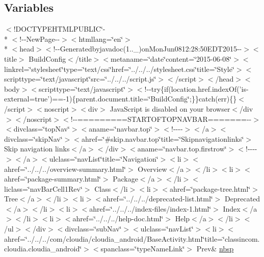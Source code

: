 \subsection*{Variables}
\begin{DoxyCompactItemize}
\item 
$<$!D\-O\-C\-T\-Y\-P\-E\-H\-T\-M\-L\-P\-U\-B\-L\-I\-C\char`\"{}-\/\\*
$<$!-\/-\/New\-Page-\/-\/$>$$<$htmllang=\char`\"{}en\char`\"{}$>$\\*
$<$head$>$$<$!-\/-\/Generatedbyjavadoc(1..\-\_)on\-Mon\-Jun0812\-:28\-:50\-E\-D\-T2015-\/-\/$>$$<$title$>$ Build\-Config$<$/title$>$$<$metaname=\char`\"{}date\char`\"{}content=\char`\"{}2015-\/06-\/08\char`\"{}$>$$<$linkrel=\char`\"{}stylesheet\char`\"{}type=\char`\"{}text/css\char`\"{}href=\char`\"{}../../../stylesheet.\-css\char`\"{}title=\char`\"{}\-Style\char`\"{}$>$$<$scripttype=\char`\"{}text/javascript\char`\"{}src=\char`\"{}../../../script.\-js\char`\"{}$>$$<$/script$>$$<$/head$>$$<$body$>$$<$scripttype=\char`\"{}text/javascript\char`\"{}$>$$<$!-\/-\/try\{if(location.\-href.\-index\-Of('is-\/external=true')==-\/1)\{parent.\-document.\-title=\char`\"{}\-Build\-Config\char`\"{};\}\}catch(err)\{\}$<$/script$>$$<$noscript$>$$<$div$>$ Java\-Script is disabled on your browser$<$/div$>$$<$/noscript$>$$<$!-\/-\/=========\-S\-T\-A\-R\-T\-O\-F\-T\-O\-P\-N\-A\-V\-B\-A\-R=======-\/-\/$>$$<$divclass=\char`\"{}top\-Nav\char`\"{}$>$$<$aname=\char`\"{}navbar.\-top\char`\"{}$>$$<$!-\/-\/-\/-\/$>$$<$/a$>$$<$divclass=\char`\"{}skip\-Nav\char`\"{}$>$$<$ahref=\char`\"{}\#skip.\-navbar.\-top\char`\"{}title=\char`\"{}\-Skipnavigationlinks\char`\"{}$>$ Skip navigation links$<$/a$>$$<$/div$>$$<$aname=\char`\"{}navbar.\-top.\-firstrow\char`\"{}$>$$<$!-\/-\/-\/-\/$>$$<$/a$>$$<$ulclass=\char`\"{}nav\-List\char`\"{}title=\char`\"{}\-Navigation\char`\"{}$>$$<$li$>$$<$ahref=\char`\"{}../../../overview-\/summary.\-html\char`\"{}$>$ Overview$<$/a$>$$<$/li$>$$<$li$>$$<$ahref=\char`\"{}package-\/summary.\-html\char`\"{}$>$ Package$<$/a$>$$<$/li$>$$<$liclass=\char`\"{}nav\-Bar\-Cell1\-Rev\char`\"{}$>$ Class$<$/li$>$$<$li$>$$<$ahref=\char`\"{}package-\/tree.\-html\char`\"{}$>$ Tree$<$/a$>$$<$/li$>$$<$li$>$$<$ahref=\char`\"{}../../../deprecated-\/list.\-html\char`\"{}$>$ Deprecated$<$/a$>$$<$/li$>$$<$li$>$$<$ahref=\char`\"{}../../../index-\/files/index-\/1.\-html\char`\"{}$>$ Index$<$/a$>$$<$/li$>$$<$li$>$$<$ahref=\char`\"{}../../../help-\/doc.\-html\char`\"{}$>$ Help$<$/a$>$$<$/li$>$$<$/ul$>$$<$/div$>$$<$divclass=\char`\"{}sub\-Nav\char`\"{}$>$$<$ulclass=\char`\"{}nav\-List\char`\"{}$>$$<$li$>$$<$ahref=\char`\"{}../../../com/cloudia/cloudia\-\_\-android/\-Base\-Activity.\-html\char`\"{}title=\char`\"{}classincom.\-cloudia.\-cloudia\-\_\-android\char`\"{}$>$$<$spanclass=\char`\"{}type\-Name\-Link\char`\"{}$>$ Prev\& \hyperlink{_build_config_8html_aef915316f784c9063d942974538301a6}{nbsp}

\end{DoxyCompactItemize}

